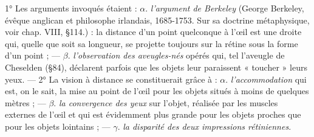 \vspace{0.24cm}
{\footnotesize 1° Les arguments invoqués étaient : $\alpha$. {\it l'argument de Berkeley}
{\scriptsize (George Berkeley, évêque anglican et philosophe irlandais,
1685-1753. Sur sa
doctrine métaphysique, voir chap. VIII, \S 114.)} : la distance
d’un point quelconque à l'œil est une droite qui, quelle que soit sa
longueur, se projette toujours sur la rétine sous la forme d’un point ; —
$\beta$. {\it l'observation des aveugles-nés} opérés qui, tel l’aveugle de Cheselden (\S 84),
déclarent parfois que les objets leur paraissent « toucher » leurs yeux. —
2° La vision à distance se constituerait grâce à : $\alpha$. {\it l’accommodation} qui est,
on le sait, la mise au point de l'œil pour les objets situés à moins de
quelques mètres ; — $\beta$. {\it la convergence des yeux} sur l'objet, réalisée par les muscles
externes de l'œil et qui est évidemment plus grande pour les objets proches
que pour les objets lointains ; — $\gamma$. {\it la disparité des deux impressions rétiniennes}.

}
